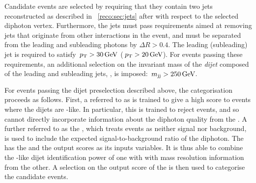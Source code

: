 Candidate \VBF events are selected by requiring that they contain two jets reconstructed as described in \Sec~\ref{reco:sec:jets} after \PFCHS with respect to the selected diphoton vertex. Furthermore, the jets must pass requirements aimed at removing jets that originate from other \pp interactions in the event, and must be separated from the leading and subleading photons by $\Delta R > 0.4$. The leading (subleading) jet is required to satisfy $\,p_\text{T} > 30 \,\text{Ge\hspace{-.08em}V}$ ($\,p_\text{T} > 20 \,\text{Ge\hspace{-.08em}V}$). For events passing these requirements, an additional selection on the invariant mass of the \emph{dijet} composed of the leading and subleading jets, \mjj, is imposed: $\,m_\text{jj} > 250\,\text{Ge\hspace{-.08em}V}$. %

For events passing the dijet preselection described above, the \VBFTag categorisation proceeds as follows. First, a \BDT referred to as \DiJetBdt is trained to give a high score to events where the dijets are \VBF-like. In particular, this is trained to reject \ggH events, and so cannot directly incorporate information about the diphoton quality from the \DiPhoBdt. %
A further \BDT referred to as the \DiPhoDiJetBdt, which treats \ggH events as neither signal nor background, is used to include the expected signal-to-background ratio of the diphoton. The \DiPhoDiJetBdt has the \DiPhoBdt and the \DiJetBdt output scores as its inputs variables. It is thus able to combine the \VBF-like dijet identification power of one \BDT with with mass resolution information from the other. %
A selection on the output score of the \DiPhoDiJetBdt is then used to categorise the candidate \VBFTag events.

